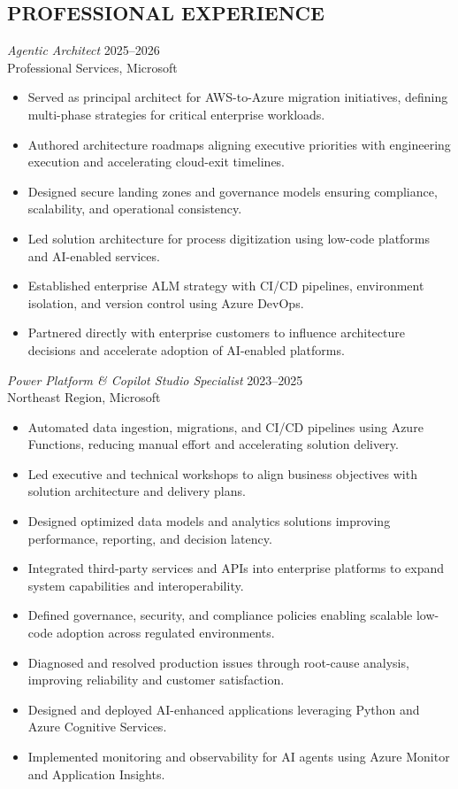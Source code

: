\documentclass[margin]{res}
\begin{document}
\begin{resume}
\section{PROFESSIONAL EXPERIENCE}

{\sl Agentic Architect} \hfill 2025--2026\\
Professional Services, Microsoft
\begin{itemize}
\item Served as principal architect for AWS-to-Azure migration initiatives, defining multi-phase strategies for critical enterprise workloads.
\item Authored architecture roadmaps aligning executive priorities with engineering execution and accelerating cloud-exit timelines.
\item Designed secure landing zones and governance models ensuring compliance, scalability, and operational consistency.
\item Led solution architecture for process digitization using low-code platforms and AI-enabled services.
\item Established enterprise ALM strategy with CI/CD pipelines, environment isolation, and version control using Azure DevOps.
\item Partnered directly with enterprise customers to influence architecture decisions and accelerate adoption of AI-enabled platforms.
\end{itemize}

{\sl Power Platform \& Copilot Studio Specialist} \hfill 2023--2025\\
Northeast Region, Microsoft
\begin{itemize}
\item Automated data ingestion, migrations, and CI/CD pipelines using Azure Functions, reducing manual effort and accelerating solution delivery.
\item Led executive and technical workshops to align business objectives with solution architecture and delivery plans.
\item Designed optimized data models and analytics solutions improving performance, reporting, and decision latency.
\item Integrated third-party services and APIs into enterprise platforms to expand system capabilities and interoperability.
\item Defined governance, security, and compliance policies enabling scalable low-code adoption across regulated environments.
\item Diagnosed and resolved production issues through root-cause analysis, improving reliability and customer satisfaction.
\item Designed and deployed AI-enhanced applications leveraging Python and Azure Cognitive Services.
\item Implemented monitoring and observability for AI agents using Azure Monitor and Application Insights.
\end{itemize}


\end{resume}
\end{document}
